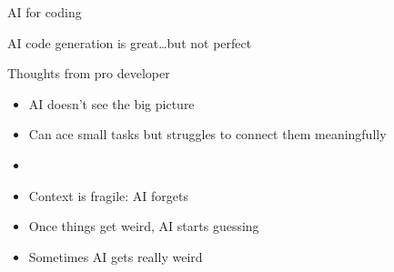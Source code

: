 \begin{frame}{AI for coding}
    
    \begin{figure}
       \centering
    \end{figure}

\end{frame}

\begin{frame}
    
    AI code generation is great\ldots but not perfect

\end{frame}


\begin{frame}

    Thoughts from pro developer 

    \begin{itemize}
        \item AI doesn't see the big picture
        \vspace{0.5em}
        \item Can ace small tasks but struggles to connect them meaningfully
        \vspace{0.5em}
        \item {}
        \vspace{0.5em}
        \item Context is fragile: AI forgets
        \vspace{0.5em}
        \item Once things get weird, AI starts guessing
        \vspace{0.5em}
        \item Sometimes AI gets really weird
    \end{itemize}

\end{frame}


